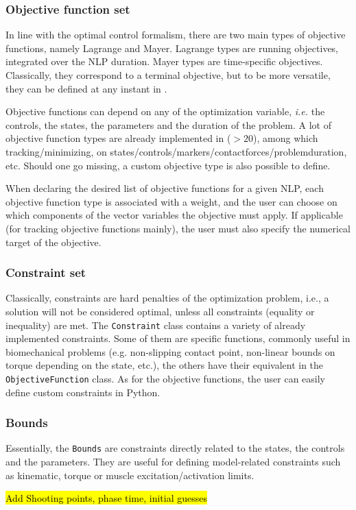 \subsubsection{Objective function set}
In line with the optimal control formalism, there are two main types of objective functions, namely Lagrange and Mayer. 
Lagrange types are running objectives, integrated over the NLP duration. Mayer types are time-specific objectives. 
Classically, they correspond to a terminal objective, but to be more versatile, they can be defined at any instant in \bioptim.

Objective functions can depend on any of the optimization variable, \textit{i.e.} the controls, the states, the parameters and the duration of the problem. 
A lot of objective function types are already implemented in \bioptim ($>\!20$), among which tracking\:/\:minimizing, on states\:/\:controls\:/\:markers\:/\:contact\:forces\:/\:problem\:duration, etc. 
Should one go missing, a custom objective type is also possible to define.

When declaring the desired list of objective functions for a given NLP, each objective function type is associated with a weight, and the user can choose on which components of the vector variables the objective must apply. 
If applicable (for tracking objective functions mainly), the user must also specify the numerical target of the objective.

\subsubsection{Constraint set}
Classically, constraints are hard penalties of the optimization problem, i.e., a solution will not be considered optimal, unless all constraints (equality or inequality) are met.
The \texttt{Constraint} class contains a variety of already implemented constraints.
Some of them are specific functions, commonly useful in biomechanical problems (e.g. non-slipping contact point, non-linear bounds on torque depending on the state, etc.), the others  
have their equivalent in the \texttt{ObjectiveFunction} class.
As for the objective functions, the user can easily define custom constraints in Python.

\subsubsection{Bounds}
Essentially, the \texttt{Bounds} are constraints directly related to the states, the controls and the parameters.
They are useful for defining model-related constraints such as kinematic, torque or muscle excitation\:/\:activation limits. 


\hl{Add Shooting points, phase time, initial guesses}
